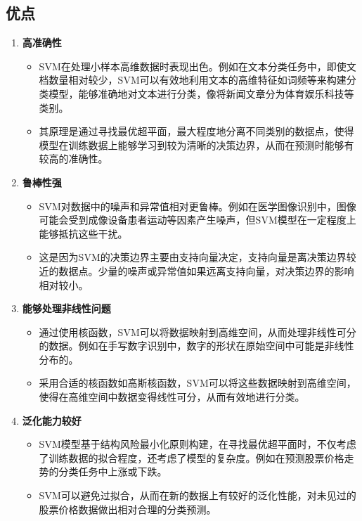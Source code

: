 \documentclass[12pt]{article}
\begin{document}
\subsection{优点}
\begin{enumerate}
    \item \textbf{高准确性}
    \begin{itemize}
        \item SVM在处理小样本高维数据时表现出色。例如在文本分类任务中，即使文档数量相对较少，SVM可以有效地利用文本的高维特征如词频等来构建分类模型，能够准确地对文本进行分类，像将新闻文章分为体育娱乐科技等类别。
        \item 其原理是通过寻找最优超平面，最大程度地分离不同类别的数据点，使得模型在训练数据上能够学习到较为清晰的决策边界，从而在预测时能够有较高的准确性。
    \end{itemize}
    \item \textbf{鲁棒性强}
    \begin{itemize}
        \item SVM对数据中的噪声和异常值相对更鲁棒。例如在医学图像识别中，图像可能会受到成像设备患者运动等因素产生噪声，但SVM模型在一定程度上能够抵抗这些干扰。
        \item 这是因为SVM的决策边界主要由支持向量决定，支持向量是离决策边界较近的数据点。少量的噪声或异常值如果远离支持向量，对决策边界的影响相对较小。
    \end{itemize}
    \item \textbf{能够处理非线性问题}
    \begin{itemize}
        \item 通过使用核函数，SVM可以将数据映射到高维空间，从而处理非线性可分的数据。例如在手写数字识别中，数字的形状在原始空间中可能是非线性分布的。
        \item 采用合适的核函数如高斯核函数，SVM可以将这些数据映射到高维空间，使得在高维空间中数据变得线性可分，从而有效地进行分类。
    \end{itemize}
    \item \textbf{泛化能力较好}
    \begin{itemize}
        \item SVM模型基于结构风险最小化原则构建，在寻找最优超平面时，不仅考虑了训练数据的拟合程度，还考虑了模型的复杂度。例如在预测股票价格走势的分类任务中上涨或下跌。
        \item SVM可以避免过拟合，从而在新的数据上有较好的泛化性能，对未见过的股票价格数据做出相对合理的分类预测。
    \end{itemize}
\end{enumerate}
\end{document}
